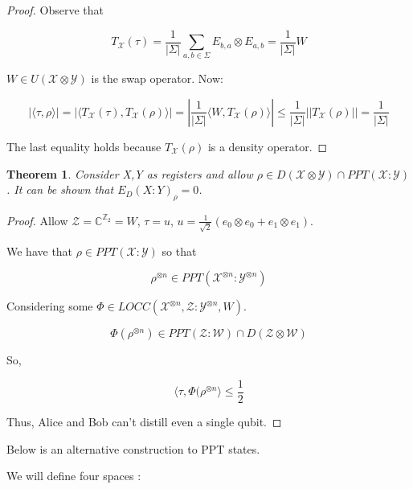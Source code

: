 \documentclass{article}
\newtheorem{theorem}{Theorem}
\begin{document}
\begin{proof}
    Observe that

    \[ 
        T_{\mathcal{X}}(\tau) = \frac{1}{\left| \Sigma \right|} \sum_{a,b \in \Sigma}
        E_{b,a} \otimes E_{a,b} = \frac{1}{\left| \Sigma \right|} W
    \]
    
    $W \in U(\mathcal{X} \otimes \mathcal{Y})$ is the swap operator. Now:

    \[ 
        |\langle \tau , \rho \rangle|= |\langle T_{\mathcal{X}} (\tau) ,
        T_{\mathcal{X}} (\rho) \rangle |= |\frac{1}{\left| \Sigma \right|} \langle
        W, T_{\mathcal{X}} (\rho) \rangle | \le \frac{1}{\left| \Sigma \right|}
        \left| \left| T_{\mathcal{X}} (\rho) \right| \right| = \frac{1}{\left|
        \Sigma \right|}
    \]
    
    The last equality holds because $T_{\mathcal{X}}(\rho)$ is a density operator.
\end{proof} 

\begin{theorem}
    Consider X,Y as registers and allow $\rho \in D(\mathcal{X} \otimes
\mathcal{Y}) \cap PPT(\mathcal{X}:\mathcal{Y})$. It can be shown that $E_D (X:Y)_\rho = 0$.
\end{theorem}

\begin{proof}
    Allow $\mathcal{Z} = \mathbb{C}^{\mathbb{Z}_2} = W$, $\tau = u$, $u =
    \frac{1}{\sqrt{2}} \left( e_0 \otimes e_0 + e_1 \otimes e_1 \right)$.

    We have that $\rho \in PPT(\mathcal{X}: \mathcal{Y})$ so that 

    \[ 
        \rho^{\otimes n} \in PPT(\mathcal{X}^{\otimes n} : \mathcal{Y}^{\otimes
        n} )
    \]
    
    Considering some $\Phi \in LOCC(\mathcal{X}^{\otimes n}, \mathcal{Z}:
    \mathcal{Y}^{\otimes n}, W)$.

    \[ 
        \Phi(\rho^{\otimes n}) \in PPT( \mathcal{Z}:\mathcal{W}) \cap
        D(\mathcal{Z} \otimes \mathcal{W})
    \]
    
    So,

    \[ 
        \langle \tau , \Phi(\rho^{\otimes n} \rangle \le \frac{1}{2}
    \]
    
    Thus, Alice and Bob can't distill even a single qubit.
\end{proof}

Below is an alternative construction to PPT states.

We will define four spaces :
\end{document}
